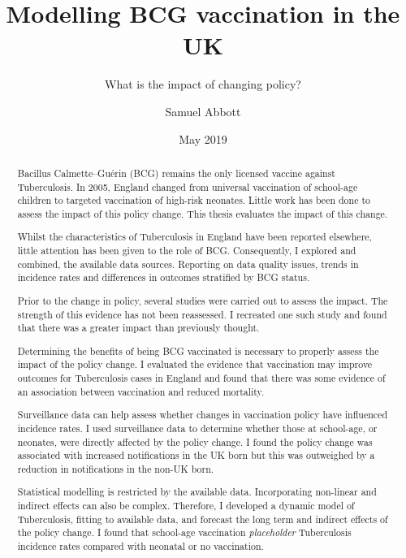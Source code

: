 \documentclass[11pt,twoside]{bristolthesis}
\title{Modelling BCG vaccination in the UK}
\subtitle{What is the impact of changing policy?}
\author{Samuel Abbott}
\date{May 2019}
\begin{document}
  \maketitle

  \frontmatter %

      \begin{abstract}
      Bacillus Calmette--Guérin (BCG) remains the only licensed vaccine against Tuberculosis. In 2005, England changed from universal vaccination of school-age children to targeted vaccination of high-risk neonates. Little work has been done to assess the impact of this policy change. This thesis evaluates the impact of this change.
      
      \par
      
      Whilst the characteristics of Tuberculosis in England have been reported elsewhere, little attention has been given to the role of BCG. Consequently, I explored and combined, the available data sources. Reporting on data quality issues, trends in incidence rates and differences in outcomes stratified by BCG status.
      
      \par
      
      Prior to the change in policy, several studies were carried out to assess the impact. The strength of this evidence has not been reassessed. I recreated one such study and found that there was a greater impact than previously thought.
      
      \par
      
      Determining the benefits of being BCG vaccinated is necessary to properly assess the impact of the policy change. I evaluated the evidence that vaccination may improve outcomes for Tuberculosis cases in England and found that there was some evidence of an association between vaccination and reduced mortality.
      
      \par
      
      Surveillance data can help assess whether changes in vaccination policy have influenced incidence rates. I used surveillance data to determine whether those at school-age, or neonates, were directly affected by the policy change. I found the policy change was associated with increased notifications in the UK born but this was outweighed by a reduction in notifications in the non-UK born.
      
      \par
      
      Statistical modelling is restricted by the available data. Incorporating non-linear and indirect effects can also be complex. Therefore, I developed a dynamic model of Tuberculosis, fitting to available data, and forecast the long term and indirect effects of the policy change. I found that school-age vaccination \emph{placeholder} Tuberculosis incidence rates compared with neonatal or no vaccination.
    \end{abstract}
\end{document}
